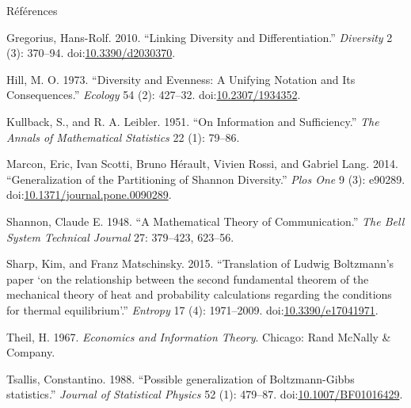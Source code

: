 \documentclass[ignorenonframetext,]{beamer}
\begin{document}
\begin{frame}{Références}

\tiny

\hypertarget{refs}{}
\hypertarget{ref-Gregorius2010}{}
Gregorius, Hans-Rolf. 2010. ``Linking Diversity and Differentiation.''
\emph{Diversity} 2 (3): 370--94.
doi:\href{https://doi.org/10.3390/d2030370}{10.3390/d2030370}.

\hypertarget{ref-Hill1973}{}
Hill, M. O. 1973. ``Diversity and Evenness: A Unifying Notation and Its
Consequences.'' \emph{Ecology} 54 (2): 427--32.
doi:\href{https://doi.org/10.2307/1934352}{10.2307/1934352}.

\hypertarget{ref-Kullback1951}{}
Kullback, S., and R. A. Leibler. 1951. ``On Information and
Sufficiency.'' \emph{The Annals of Mathematical Statistics} 22 (1):
79--86.

\hypertarget{ref-Marcon2014a}{}
Marcon, Eric, Ivan Scotti, Bruno Hérault, Vivien Rossi, and Gabriel
Lang. 2014. ``Generalization of the Partitioning of Shannon Diversity.''
\emph{Plos One} 9 (3): e90289.
doi:\href{https://doi.org/10.1371/journal.pone.0090289}{10.1371/journal.pone.0090289}.

\hypertarget{ref-Shannon1948}{}
Shannon, Claude E. 1948. ``A Mathematical Theory of Communication.''
\emph{The Bell System Technical Journal} 27: 379--423, 623--56.

\hypertarget{ref-Sharp2015}{}
Sharp, Kim, and Franz Matschinsky. 2015. ``Translation of Ludwig
Boltzmann's paper `on the relationship between the second fundamental
theorem of the mechanical theory of heat and probability calculations
regarding the conditions for thermal equilibrium'.'' \emph{Entropy} 17
(4): 1971--2009.
doi:\href{https://doi.org/10.3390/e17041971}{10.3390/e17041971}.

\hypertarget{ref-Theil1967}{}
Theil, H. 1967. \emph{Economics and Information Theory}. Chicago: Rand
McNally \& Company.

\hypertarget{ref-Tsallis1988}{}
Tsallis, Constantino. 1988. ``Possible generalization of Boltzmann-Gibbs
statistics.'' \emph{Journal of Statistical Physics} 52 (1): 479--87.
doi:\href{https://doi.org/10.1007/BF01016429}{10.1007/BF01016429}.

\end{frame}
\end{document}
